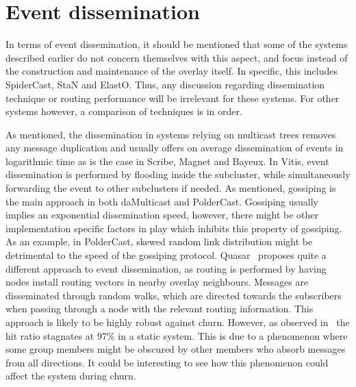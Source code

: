 \section{Event dissemination}

In terms of event dissemination, it should be mentioned that some of
the systems described earlier do not concern themselves with this aspect, and
focus instead of the construction and maintenance of the overlay
itself. In specific, this includes SpiderCast, StaN and ElastO. Thus, any
discussion regarding dissemination technique or routing performance
will be irrelevant for these systems. For other systems however, a
comparison of techniques is in order.

As mentioned, the dissemination in systems relying on multicast trees
removes any message duplication and usually offers on average
dissemination of events in logarithmic time as is the case in Scribe,
Magnet and Bayeux. In Vitis, event dissemination is performed by
flooding inside the subcluster, while simultaneously forwarding the
event to other subclusters if needed. As mentioned, gossiping is the
main approach in both daMulticast and PolderCast.  Gossiping usually
implies an exponential dissemination speed, however, there might be
other implementation specific factors in play which inhibits this
property of gossiping. As an example, in PolderCast, skewed random link
distribution might be detrimental to the speed of the gossiping
protocol. Quasar~\cite{Wong:2008} proposes quite a different approach
to event dissemination, as routing is performed by having nodes install
routing vectors in nearby overlay neighbours. Messages are disseminated
through random walks, which are directed towards the subscribers when
passing through a node with the relevant routing information. This
approach is likely to be highly robust against churn. However, as
observed in~\cite{Wong:2008} the hit ratio stagnates at 97\% in a
static system. This is due to a phenomenon where some group members
might be obscured by other members who absorb messages
from all directions. It could be interesting to see how this phenomenon
could affect the system during churn.




